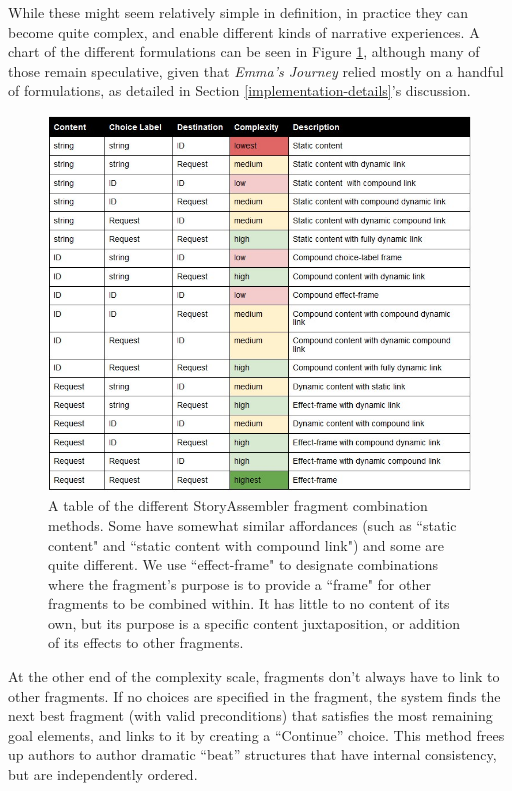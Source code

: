 While these might seem relatively simple in definition, in practice they can become quite complex, and enable different kinds of narrative experiences. A chart of the different formulations can be seen in Figure \ref{fig:fragment-table}, although many of those remain speculative, given that \textit{Emma's Journey} relied mostly on a handful of formulations, as detailed in Section \ref{implementation-details}'s discussion.


\begin{figure}
    \centering
    \includegraphics[width=\textwidth]{figures/3-StoryAssembler/fragment-table.jpg}
    \caption{A table of the different StoryAssembler fragment combination methods. Some have somewhat similar affordances (such as ``static content" and ``static content with compound link") and some are quite different. We use ``effect-frame" to designate combinations where the fragment's purpose is to provide a ``frame" for other fragments to be combined within. It has little to no content of its own, but its purpose is a specific content juxtaposition, or addition of its effects to other fragments.}
    \label{fig:fragment-table}
\end{figure}


At the other end of the complexity scale, fragments don't always have to link to other fragments. If no choices are specified in the fragment, the system finds the next best fragment (with valid preconditions) that satisfies the most remaining goal elements, and links to it by creating a ``Continue'' choice. This method frees up authors to author dramatic ``beat'' structures that have internal consistency, but are independently ordered.

